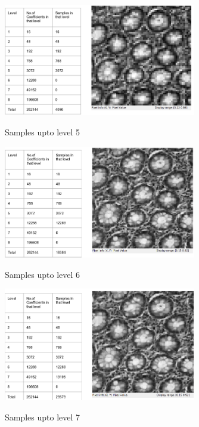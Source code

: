 \documentclass{article}
\begin{document}
\begin{figure}[ht]
 \centering  
 \includegraphics[width=0.75\textwidth]{Figures/upto_level5.png}
 \label{fig:1}
 \caption{Samples upto level 5}
\end{figure}

\begin{figure}[ht]
 \centering  
 \includegraphics[width=0.75\textwidth]{Figures/upto_level6.png}
 \label{fig:1}
 \caption{Samples upto level 6}
\end{figure}

\begin{figure}[ht]
 \centering  
 \includegraphics[width=0.75\textwidth]{Figures/upto_level7.png}
 \label{fig:1}
 \caption{Samples upto level 7}
\end{figure}
\end{document}
